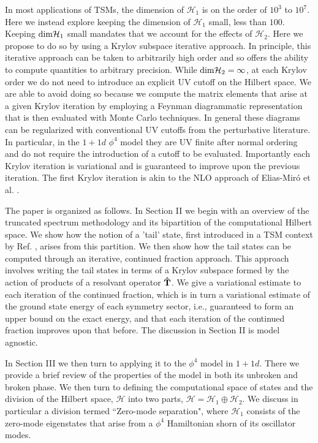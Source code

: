 \documentclass[twocolumn,secnumarabic,amssymb, nobibnotes, aps, prd]{revtex4-2}
\begin{document}
In most applications of TSMs, the dimension of $\mathcal{H}_1$ is on the order of $10^3$ to $10^7$.  Here we instead explore keeping the dimension of $\mathcal{H}_1$ small, less than $100$.  Keeping ${\rm dim}\mathcal{H}_1$ small mandates that we account for the effects of $\mathcal{H}_2$.  Here we propose to do so by using a Krylov subspace iterative approach.  In principle, this iterative approach can be taken to arbitrarily high order and so offers the ability to compute quantities to arbitrary precision. 
While ${\rm dim}\mathcal{H}_2=\infty$, at each Krylov order we do not need to introduce an explicit UV cutoff on the Hilbert space.  We are able to avoid doing so because we compute the matrix elements that arise at a given Krylov iteration by employing a Feynman diagrammatic representation that is then evaluated with Monte Carlo techniques. In general these diagrams can be regularized with conventional UV cutoffs from the perturbative literature. In particular, in the $1+1d$ $\phi^4$ model they are UV finite after normal ordering and do not require the introduction of a cutoff to be evaluated.
Importantly each Krylov iteration is variational and is guaranteed to improve upon the previous iteration.  The first Krylov iteration is akin to the NLO approach of Elias-Miró et al. \cite{Elias-Miro:2017tup}.

The paper is organized as follows.  In Section II we begin with an overview of the truncated spectrum methodology and its bipartition of the computational Hilbert space.  We show how the notion of a 'tail' state, first introduced in a TSM context by Ref. \cite{Elias-Miro:2017tup}, arises from this partition.  We then show how the tail states can be computed through an iterative, continued fraction approach.  This approach involves writing the tail states in terms of a Krylov subspace formed by the action of products of a resolvant operator $\bf{\hat T}$. 
We give a variational estimate to each iteration of the continued fraction, which is in turn
a variational estimate of the ground state energy of each symmetry sector, i.e., guaranteed to form an upper bound on the exact energy, and that each iteration of the continued fraction improves upon that before.    The discussion in Section II is model agnostic.  

In Section III we then turn to applying it to the $\phi^4$ model in $1+1d$.  There we provide a brief review of the properties of the model in both its unbroken and broken phase.  We then turn to defining the computational space of states and the division of the Hilbert space, $\mathcal{H}$ into two parts, $\mathcal{H} = \mathcal{H}_1\oplus \mathcal{H}_2$.  
We discuss in particular a division termed ``Zero-mode separation", where $\mathcal{H}_1$ consists of the zero-mode eigenstates that arise from a $\phi^4$ Hamiltonian shorn of its oscillator modes.
\end{document}
